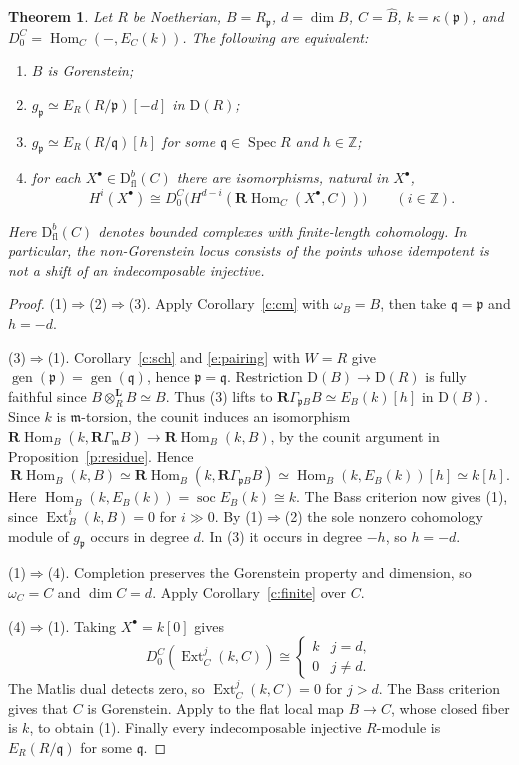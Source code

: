 \documentclass[11pt,reqno]{amsart}
\newtheorem{theorem}{Theorem}[section]
\theoremstyle{definition}
\DeclareMathOperator{\gen}{gen}
\DeclareMathOperator{\Spec}{Spec}
\DeclareMathOperator{\Hom}{Hom}
\DeclareMathOperator{\Ext}{Ext}
\newcommand{\D}{\mathrm D}
\newcommand{\p}{\mathfrak p}
\newcommand{\q}{\mathfrak q}
\newcommand{\m}{\mathfrak m}
\newcommand{\RHom}{\mathbf R\!\operatorname{Hom}}
\newcommand{\RG}{\mathbf R\Gamma}
\newcommand{\dt}{\otimes^{\mathbf L}}
\newcommand{\fl}{\mathrm{fl}}
\newcommand{\kpp}{\kappa(\p)}
\numberwithin{equation}{section}
\begin{document}
\begin{theorem}\label{t:bass}
Let $R$ be Noetherian, $B=R_{\p}$, $d=\dim B$, $C=\widehat B$, $k=\kpp$, and $D_0^C=\Hom_C(-,E_C(k))$. The following are equivalent:
\begin{enumerate}
\item $B$ is Gorenstein;
\item $g_{\p}\simeq E_R(R/\p)[-d]$ in $\D(R)$;
\item $g_{\p}\simeq E_R(R/\q)[h]$ for some $\q\in\Spec R$ and $h\in\mathbb Z$;
\item for each $X^\bullet\in\D^b_{\fl}(C)$ there are isomorphisms, natural in $X^\bullet$,
\[
 H^i(X^\bullet)\cong D_0^C\big(H^{d-i}(\RHom_C(X^\bullet,C))\big)\qquad(i\in\mathbb Z).
\]
\end{enumerate}
Here $\D^b_{\fl}(C)$ denotes bounded complexes with finite-length cohomology. In particular, the non-Gorenstein locus consists of the points whose idempotent is not a shift of an indecomposable injective.
\end{theorem}
\begin{proof}
(1)$\Rightarrow$(2)$\Rightarrow$(3). Apply Corollary~\ref{c:cm} with $\omega_B=B$, then take $\q=\p$ and $h=-d$.

(3)$\Rightarrow$(1). Corollary~\ref{c:sch} and \eqref{e:pairing} with $W=R$ give $\gen(\p)=\gen(\q)$, hence $\p=\q$. Restriction $\D(B)\to\D(R)$ is fully faithful since $B\dt_R B\simeq B$. Thus (3) lifts to $\RG_{\p B}B\simeq E_B(k)[h]$ in $\D(B)$. Since $k$ is $\m$-torsion, the counit induces an isomorphism $\RHom_B(k,\RG_{\m} B)\to\RHom_B(k,B)$, by the counit argument in Proposition~\ref{p:residue}. Hence
\[
 \RHom_B(k,B)\simeq\RHom_B(k,\RG_{\p B}B)
 \simeq\Hom_B(k,E_B(k))[h]\simeq k[h].
\]
Here $\Hom_B(k,E_B(k))=\operatorname{soc}E_B(k)\cong k$. The Bass criterion \cite[Lemma~47.21.5]{stacks} now gives (1), since $\Ext_B^i(k,B)=0$ for $i\gg0$. By (1)$\Rightarrow$(2) the sole nonzero cohomology module of $g_{\p}$ occurs in degree $d$. In (3) it occurs in degree $-h$, so $h=-d$.

(1)$\Rightarrow$(4). Completion preserves the Gorenstein property and dimension, so $\omega_C=C$ and $\dim C=d$. Apply Corollary~\ref{c:finite} over $C$.

(4)$\Rightarrow$(1). Taking $X^\bullet=k[0]$ gives
\[
 D_0^C(\Ext^j_C(k,C))\cong
 \begin{cases} k& j=d,\\0& j\ne d.\end{cases}
\]
The Matlis dual detects zero, so $\Ext_C^j(k,C)=0$ for $j>d$. The Bass criterion gives that $C$ is Gorenstein. Apply \cite[Lemma~47.21.9]{stacks} to the flat local map $B\to C$, whose closed fiber is $k$, to obtain (1). Finally every indecomposable injective $R$-module is $E_R(R/\q)$ for some $\q$.
\end{proof}
\end{document}
